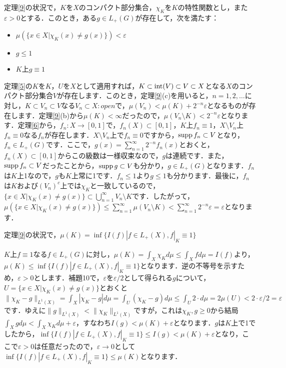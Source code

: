 \begin{ylem}\label{10}
定理\ref{9}の状況で，$K$を$X$のコンパクト部分集合，$\chi_{K}$を$K$の特性関数とし，また$\varepsilon >0$とする．このとき，ある$g \in L_{+}(G)$が存在して，次を満たす：
\begin{itemize}
 \item $\mu ( \{ x \in X | \chi_{K}(x) \neq g(x) \} ) < \varepsilon $
 \item $g \le 1$
 \item $K$上$g \equiv 1$
\end{itemize}
\end{ylem}
\begin{Proof}
定理\ref{5}の$K$を$K$，$U$を$X$として適用すれば，$K \subset \operatorname{int}(V) \subset V \subset X$となる$X$のコンパクト部分集合$V$が存在します．このとき，定理\ref{9}(c)を用いると，$n=1,2,\ldots$に対し，$K \subset V_n \subset V$なる$V_n \subset X \colon open$で，$\mu(V_n) < \mu(K) + 2^{-n}\varepsilon$となるものが存在します．定理\ref{9}(b)から$\mu(K)<\infty$だったので，$\mu(V_n \setminus K) < 2^{-n}\varepsilon$となります．定理\ref{6}から，$f_n \colon X \to [0,1]$で，$f_n(X) \subset [0,1]$，$K$上$f_n \equiv 1$，$X \setminus V_n$上$f_n \equiv 0$なる$f_n$が存在します．$X \setminus V_{n}$上で$f_{n} \equiv 0$ですから，$\operatorname{supp} f_{n} \subset V$となり，$f_{n} \in L_{+}(G)$です．ここで，$g(x)=\sum_{n=1}^{\infty}2^{-n}f_n(x)$とおくと，$f_{n}(X) \subset [0,1]$からこの級数は一様収束なので，$g$は連続です．また，$\operatorname{supp} f_{n} \subset V$だったことから，$\operatorname{supp} g \subset V$も分かり，$g \in L_{+}(G)$となります．$f_n$は$K$上1なので，$g$も$K$上常に1です．$f_n \le 1$より$g \le 1$も分かります．最後に，$f_n$は$K$および$(V_n)^{c}$上では$\chi_{K}$と一致しているので，$\{ x \in X | \chi_{K}(x) \neq g(x) \} \subset \bigcup_{n=1}^{\infty}V_n \setminus K$です．したがって，$\mu( \{ x \in X | \chi_{K}(x) \neq g(x) \} ) \le \sum_{n=1}^{\infty} \mu(V_n \setminus K) < \sum_{n=1}^{\infty}2^{-n}\varepsilon=\varepsilon$となります．
\end{Proof}
\begin{yprop}\label{11}
定理\ref{9}の状況で，$\mu(K)= \inf \{ I(f) | f \in L_{+}(X), f|_{K} \equiv 1 \}$
\end{yprop}
\begin{Proof}
$K$上$f \equiv 1$なる$f \in L_{+}(G)$に対し，$ \mu(K)=\int_{X}\chi_K d\mu \le \int_{X}f d\mu=I(f)$より，$\mu(K) \le \inf \{ I(f) | f \in L_{+}(X), f|_{K} \equiv 1 \}$となります．逆の不等号を示すため，$\varepsilon>0$とします．補題10で，$\varepsilon$を$\varepsilon /2$として得られる$g$について，$U=\{ x \in X | \chi_{K}(x) \neq g(x) \}$とおくと$\| \chi_{K}-g\| _{L^1(X)} = \int_{X}|\chi_K-g|d\mu = \int_{U}(\chi_K-g)d\mu \le \int_{U}2 \cdot d\mu=2\mu(U)<2 \cdot \varepsilon / 2=\varepsilon$です．ゆえに$\| g\|  _{L^1(X)} < \| \chi_{K} \| _{L^1(X)} $ですが，これは$\chi_K, g \ge 0$から結局 $\int_{X}gd\mu < \int_{X}\chi_{K}d\mu +\varepsilon$，すなわち$I(g)<\mu (K)+\varepsilon$となります．$g$は$K$上で1でしたから，$\inf \{ I(f) | f \in L_{+}(X), f|_{K} \equiv 1 \} \le I(g) <\mu (K)+\varepsilon$となり，ここで$\varepsilon>0$は任意だったので，$\varepsilon \to 0$として $\inf \{ I(f) | f \in L_{+}(X), f|_{K} \equiv 1 \} \le \mu (K)$となります．
\end{Proof}

